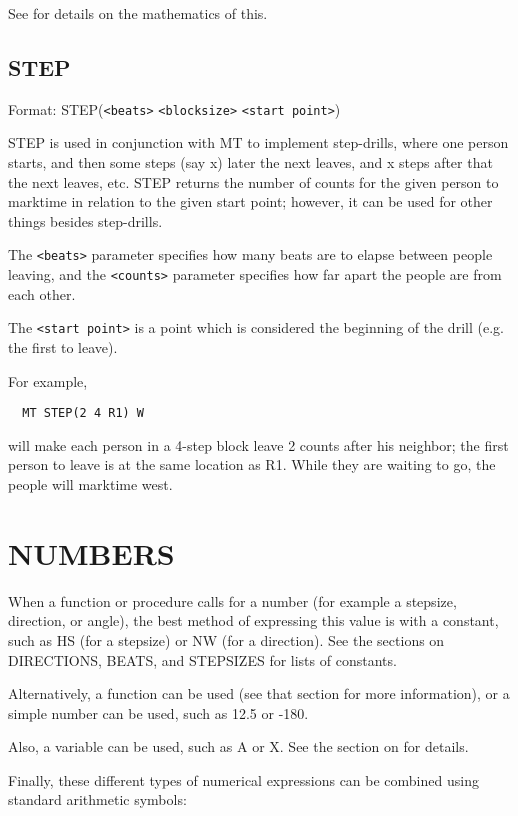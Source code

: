 See  for details on the mathematics of this.

\subsection{STEP}\label{step}

Format: STEP(\verb$<beats>$ \verb$<blocksize>$ \verb$<start point>$)

STEP is used in conjunction with MT to implement step-drills,
where one person starts, and then some steps (say x) later the next leaves,
and x steps after that the next leaves, etc.  STEP returns the number of
counts for the given person to marktime in relation to the given start
point; however, it can be used for other things besides step-drills.

The \verb$<beats>$ parameter specifies how many beats are to elapse between
people leaving, and the \verb$<counts>$ parameter specifies how far apart the
people are from each other.

The \verb$<start point>$ is a point which is considered the beginning of
the drill (e.g. the first to leave).

For example,
\begin{verbatim}
  MT STEP(2 4 R1) W
\end{verbatim}
will make each person in a 4-step block leave 2 counts after his neighbor;
the first person to leave is at the same location as R1.  While they are
waiting to go, the people will marktime west.

\section{NUMBERS}\label{numbers}

When a function or procedure calls for a number (for example a stepsize,
direction, or angle), the best method of expressing this value is with
a constant, such as HS (for a stepsize) or NW (for a direction).
See the sections on DIRECTIONS, BEATS, and STEPSIZES for lists
of constants.

Alternatively, a function can be used (see that section for more
information), or a simple number can be used, such as 12.5 or -180.

Also, a variable can be used, such as A or X.  See the section on
 for details.

Finally, these different types of numerical expressions can be combined
using standard arithmetic symbols:

